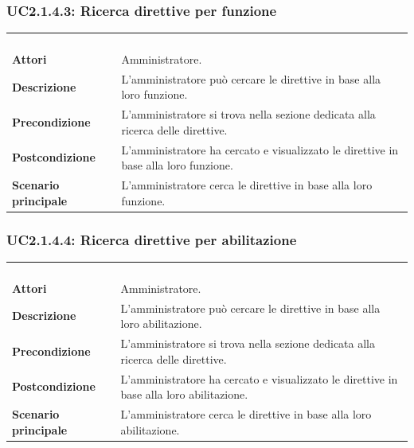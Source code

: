 \subsubsection{UC2.1.4.3: Ricerca direttive per funzione}
\label{UC2.1.4.3}
\begin{longtable}{l|p{10cm}}
\rowcolor[gray]{0.8} \multicolumn{2}{c}{} \\
\rowcolor[gray]{0.8} \multicolumn{2}{c}{\textbf{UC2.1.4.3 - Ricerca direttive per funzione}} \\
\rowcolor[gray]{0.8} \multicolumn{2}{c}{} \\
\hline
&\\
\textbf{Attori} & Amministratore.\\[7pt]
\textbf{Descrizione} & L'amministratore può cercare le direttive in base alla loro funzione.\\[7pt]
\textbf{Precondizione} & L'amministratore si trova nella sezione dedicata alla ricerca delle direttive.\\[7pt]
\textbf{Postcondizione} & L'amministratore ha cercato e visualizzato le direttive in base alla loro funzione.\\[7pt]
\textbf{Scenario principale} &L'amministratore cerca le direttive in base alla loro funzione.\\[7pt]\hline
\end{longtable}
\newpage
\subsubsection{UC2.1.4.4: Ricerca direttive per abilitazione}
\label{UC2.1.4.4}
\begin{longtable}{l|p{10cm}}
\rowcolor[gray]{0.8} \multicolumn{2}{c}{} \\
\rowcolor[gray]{0.8} \multicolumn{2}{c}{\textbf{UC2.1.4.4 - Ricerca direttive per abilitazione}} \\
\rowcolor[gray]{0.8} \multicolumn{2}{c}{} \\
\hline
&\\
\textbf{Attori} & Amministratore.\\[7pt]
\textbf{Descrizione} & L'amministratore può cercare le direttive in base alla loro abilitazione.\\[7pt]
\textbf{Precondizione} & L'amministratore si trova nella sezione dedicata alla ricerca delle direttive.\\[7pt]
\textbf{Postcondizione} & L'amministratore ha cercato e visualizzato le direttive in base alla loro abilitazione.\\[7pt]
\textbf{Scenario principale} &L'amministratore cerca le direttive in base alla loro abilitazione.\\[7pt]\hline
\end{longtable}

